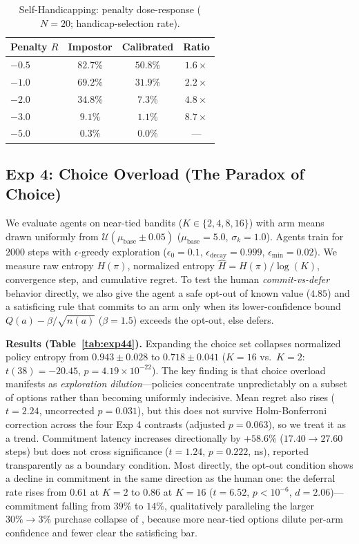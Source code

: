 \documentclass[conference]{IEEEtran}
\begin{document}
\begin{table}[htbp]
\centering
\footnotesize
\setlength{\tabcolsep}{4pt}
\caption{Self-Handicapping: penalty dose-response ($N=20$; handicap-selection rate).}
\label{tab:exp43}
\begin{tabularx}{\linewidth}{@{}Lccc@{}}
\toprule
\textbf{Penalty $R$} & \textbf{Impostor} & \textbf{Calibrated} & \textbf{Ratio} \\
\midrule
$-0.5$ & $82.7\%$ & $50.8\%$ & $1.6\times$ \\
$-1.0$ & $69.2\%$ & $31.9\%$ & $2.2\times$ \\
$-2.0$ & $34.8\%$ & $7.3\%$  & $4.8\times$ \\
$-3.0$ & $9.1\%$  & $1.1\%$  & $8.7\times$ \\
$-5.0$ & $0.3\%$  & $0.0\%$  & --- \\
\bottomrule
\end{tabularx}
\end{table}

\subsection{Exp 4: Choice Overload (The Paradox of Choice)}

We evaluate agents on near-tied bandits ($K\in\{2,4,8,16\}$) with arm means drawn uniformly from $\mathcal{U}(\mu_{\text{base}}\pm0.05)$ ($\mu_{\text{base}}=5.0$, $\sigma_k=1.0$). Agents train for 2000 steps with $\epsilon$-greedy exploration ($\epsilon_0=0.1$, $\epsilon_{\text{decay}}=0.999$, $\epsilon_{\text{min}}=0.02$). We measure raw entropy $H(\pi)$, normalized entropy $\hat{H}=H(\pi)/\log(K)$, convergence step, and cumulative regret. To test the human \textit{commit-vs-defer} behavior directly, we also give the agent a safe opt-out of known value ($4.85$) and a satisficing rule \citep{schwartz2004paradox} that commits to an arm only when its lower-confidence bound $Q(a)-\beta/\sqrt{n(a)}$ ($\beta=1.5$) exceeds the opt-out, else defers.

\textbf{Results (Table~\ref{tab:exp44}).} Expanding the choice set collapses normalized policy entropy from $0.943\pm0.028$ to $0.718\pm0.041$ ($K=16$ vs.\ $K=2$: $t(38)=-20.45$, $p=4.19\times10^{-22}$). The key finding is that choice overload manifests as \textit{exploration dilution}---policies concentrate unpredictably on a subset of options rather than becoming uniformly indecisive. Mean regret also rises ($t=2.24$, uncorrected $p=0.031$), but this does not survive Holm-Bonferroni correction across the four Exp 4 contrasts (adjusted $p=0.063$), so we treat it as a trend. Commitment latency increases directionally by $+58.6\%$ ($17.40\to27.60$ steps) but does not cross significance ($t=1.24$, $p=0.222$, ns), reported transparently as a boundary condition. Most directly, the opt-out condition shows a decline in commitment in the same direction as the human one: the deferral rate rises from $0.61$ at $K=2$ to $0.86$ at $K=16$ ($t=6.52$, $p<10^{-6}$, $d=2.06$)---commitment falling from $39\%$ to $14\%$, qualitatively paralleling the larger $30\%\to3\%$ purchase collapse of \citet{iyengar2000choice}, because more near-tied options dilute per-arm confidence and fewer clear the satisficing bar.
\end{document}
